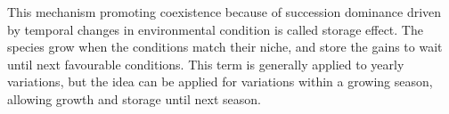 \begin{figure}%
    \classiccaptionstyle
{}
\end{figure}

This mechanism promoting coexistence because of succession dominance driven by temporal changes in environmental condition is called storage effect. The species grow when the conditions match their niche, and store the gains to wait until next favourable conditions. This term is generally applied to yearly variations, but the idea can be applied for variations within a growing season, allowing growth and storage until next season.

%
%
%
%
%
%

 
